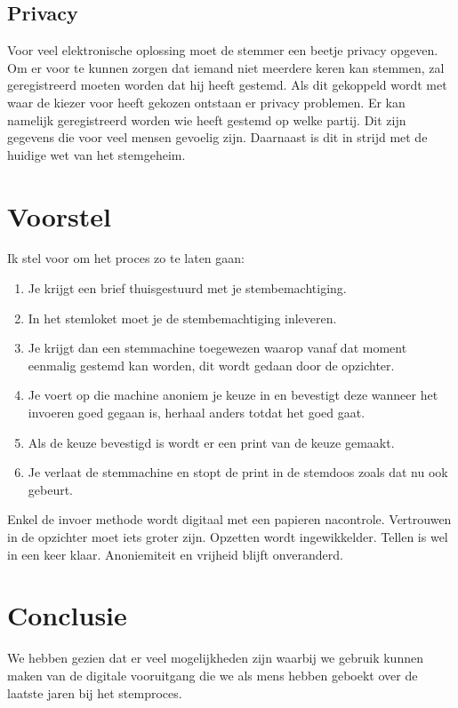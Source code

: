 \documentclass[a4paper]{article}
\newcommand{\TODO}[1]{{\color{red}\textbf{TODO: #1}}}
\renewcommand{\TODO}[1]{}
\begin{document}
\subsection{Privacy}
Voor veel elektronische oplossing moet de stemmer een beetje privacy opgeven.
Om er voor te kunnen zorgen dat iemand niet meerdere keren kan stemmen, zal geregistreerd moeten worden dat hij heeft gestemd. 
Als dit gekoppeld wordt met waar de kiezer voor heeft gekozen ontstaan er privacy problemen.
Er kan namelijk geregistreerd worden wie heeft gestemd op welke partij. 
Dit zijn gegevens die voor veel mensen gevoelig zijn.
Daarnaast is dit in strijd met de huidige wet van het stemgeheim.

\newpage

\section{Voorstel}

\TODO{samenvoegen met conclusie? Compacter?}

Ik stel voor om het proces zo te laten gaan:

\begin{enumerate}
\item Je krijgt een brief thuisgestuurd met je stembemachtiging. 
\item In het stemloket moet je de stembemachtiging inleveren. 
\item Je krijgt dan een stemmachine toegewezen waarop vanaf dat moment  eenmalig gestemd kan worden, dit wordt gedaan door de opzichter. 
\item Je voert op die machine anoniem je keuze in en bevestigt deze wanneer het invoeren goed gegaan is, herhaal anders totdat het goed gaat.
\item Als de keuze bevestigd is wordt er een print van de keuze gemaakt. 
\item Je verlaat de stemmachine en stopt de print in de stemdoos zoals dat nu ook gebeurt. 
\end{enumerate}

\noindent
Enkel de invoer methode wordt digitaal met een papieren nacontrole. Vertrouwen in de opzichter moet iets groter zijn. Opzetten wordt ingewikkelder. Tellen is wel in een keer klaar. Anoniemiteit en vrijheid blijft onveranderd. 
\TODO{uitgebreid beschrijven van concessie, tegenargumenten counteren}

\section{Conclusie}
We hebben gezien dat er veel mogelijkheden zijn waarbij we gebruik kunnen maken van de digitale vooruitgang die we als mens hebben geboekt over de laatste jaren bij het stemproces. 
\end{document}
